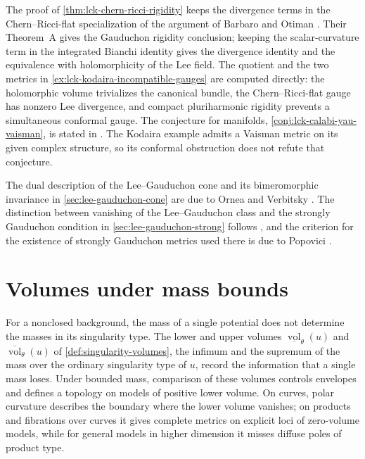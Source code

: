 The proof of \cref{thm:lck-chern-ricci-rigidity} keeps the divergence terms in the Chern--Ricci-flat specialization of the argument of Barbaro and Otiman \cite[v2, Section~4, equations~(2)--(4), pp.~12--13]{BO25LCK}. Their Theorem~A gives the Gauduchon rigidity conclusion; keeping the scalar-curvature term in the integrated Bianchi identity gives the divergence identity and the equivalence with holomorphicity of the Lee field. The quotient and the two metrics in \cref{ex:lck-kodaira-incompatible-gauges} are computed directly: the holomorphic volume trivializes the canonical bundle, the Chern--Ricci-flat gauge has nonzero Lee divergence, and compact pluriharmonic rigidity prevents a simultaneous conformal gauge. The conjecture for manifolds, \cref{conj:lck-calabi-yau-vaisman}, is stated in \cite[v2, Introduction, p.~2]{BO25LCK}. The Kodaira example admits a Vaisman metric on its given complex structure, so its conformal obstruction does not refute that conjecture.

The dual description of the Lee--Gauduchon cone and its bimeromorphic invariance in \cref{sec:lee-gauduchon-cone} are due to Ornea and Verbitsky \cite[Theorems~3.11 and 4.5, pp.~243--244]{OV25LeeGauduchon}. The distinction between vanishing of the Lee--Gauduchon class and the strongly Gauduchon condition in \cref{sec:lee-gauduchon-strong} follows \cite[Remark~5.6, Example~5.7 and Remark~5.8, pp.~245--246]{OV25LeeGauduchon}, and the criterion for the existence of strongly Gauduchon metrics used there is due to Popovici \cite[Proposition~1.2, p.~654]{Pop13SG}.

\section{Volumes under mass bounds}
\label{sec:history-volumes}

For a nonclosed background, the mass of a single potential does not determine the masses in its singularity type. The lower and upper volumes $\underline{\operatorname{vol}}_\theta(u)$ and $\overline{\operatorname{vol}}_\theta(u)$ of \cref{def:singularity-volumes}, the infimum and the supremum of the mass over the ordinary singularity type of $u$, record the information that a single mass loses. Under bounded mass, comparison of these volumes controls envelopes and defines a topology on models of positive lower volume. On curves, polar curvature describes the boundary where the lower volume vanishes; on products and fibrations over curves it gives complete metrics on explicit loci of zero-volume models, while for general models in higher dimension it misses diffuse poles of product type.

